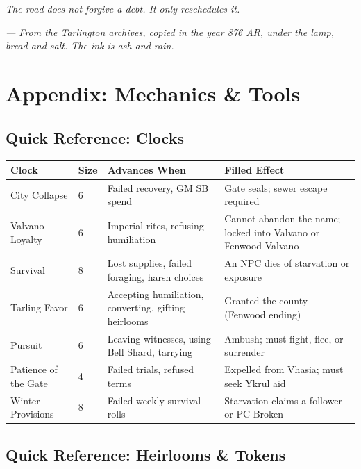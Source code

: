 \documentclass[11pt,a5paper]{book}
\begin{document}
\vspace{2em}
\noindent\textit{The road does not forgive a debt. It only reschedules it.}

\vspace{2em}
\noindent\textit{--- From the Tarlington archives, copied in the year 876 AR, under the lamp, bread and salt. The ink is ash and rain.}

\clearpage

\appendix
\chapter*{Appendix: Mechanics \& Tools}

\section*{Quick Reference: Clocks}

\begin{center}
\begin{tabular}{@{}llp{6cm}p{5cm}@{}}
\toprule
\textbf{Clock} & \textbf{Size} & \textbf{Advances When} & \textbf{Filled Effect} \\
\midrule
City Collapse & 6 & Failed recovery, GM SB spend & Gate seals; sewer escape required \\
Valvano Loyalty & 6 & Imperial rites, refusing humiliation & Cannot abandon the name; locked into Valvano or Fenwood-Valvano \\
Survival & 8 & Lost supplies, failed foraging, harsh choices & An NPC dies of starvation or exposure \\
Tarling Favor & 6 & Accepting humiliation, converting, gifting heirlooms & Granted the county (Fenwood ending) \\
Pursuit & 6 & Leaving witnesses, using Bell Shard, tarrying & Ambush; must fight, flee, or surrender \\
Patience of the Gate & 4 & Failed trials, refused terms & Expelled from Vhasia; must seek Ykrul aid \\
Winter Provisions & 8 & Failed weekly survival rolls & Starvation claims a follower or PC Broken \\
\bottomrule
\end{tabular}
\end{center}

\section*{Quick Reference: Heirlooms \& Tokens}
\end{document}
